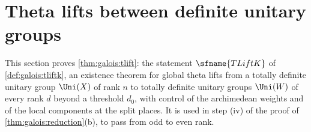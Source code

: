 \section{Theta lifts between definite unitary groups}\label{sec:pf:tlift}

\providecommand{\tliftS}{\mathcal{S}}
\providecommand{\tliftPol}{\mathcal{P}}
\providecommand{\tliftPD}{\mathcal{P}_{\A}}
\providecommand{\tliftAE}{\A_E}
\providecommand{\tliftdia}{\Delta}
\providecommand{\tliftK}{K_2}
\providecommand{\tliftKfr}{K_{\mathrm{fr}}}
\providecommand{\tliftht}{\mathsf{a}}
\providecommand{\tliftlift}{\Theta}
\providecommand{\tliftZ}{Z}
\providecommand{\tliftM}{M}
\providecommand{\tliftLW}{\mathrm{LW}}
\providecommand{\tliftLP}{\mathrm{LP}}
\providecommand{\tliftInt}{K^{\mathrm{int}}}
\providecommand{\tliftGinf}{G_\infty}
\providecommand{\tliftGS}{G_S}
\providecommand{\tliftGoff}{G^{S}}
\providecommand{\tliftvac}{\varphi^{\circ}}
\providecommand{\tliftsymp}{\langle\cdot,\cdot\rangle}
\providecommand{\tliftV}{V}
\providecommand{\tliftPP}{\mathbf{P}}
\providecommand{\tliftE}{\widehat{E}}

This section proves \cref{thm:galois:tlift}: the statement $\sfname{TLiftK}$ of
\cref{def:galois:tliftk}, an existence theorem for global theta lifts from a totally definite unitary
group $\Uni(X)$ of rank $n$ to totally definite unitary groups $\Uni(W)$ of every rank $d$ beyond a
threshold $d_0$, with control of the archimedean weights and of the local components at the split
places. It is used in step (iv) of the proof of \cref{thm:galois:reduction}(b), to pass from odd to even
rank.

